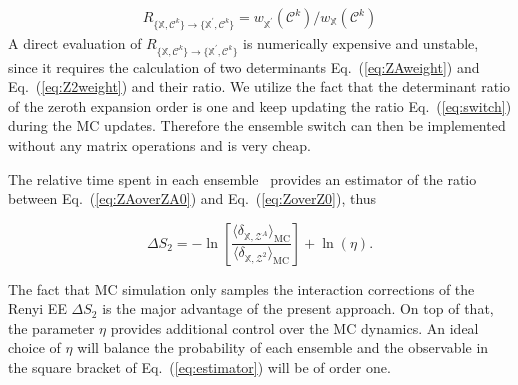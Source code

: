 \documentclass[12pt,onecolumn,english,prl,showpacs,nofootinbib]{revtex4-1}
\begin{document}
\begin{eqnarray}
R_{\{\mathbb{X}, \mathcal{C}^{k}\} \rightarrow \{\mathbb{X}^{\prime}, \mathcal{C}^{k}\} } = {w_{\mathbb{X}^{\prime}}(\mathcal{C}^{k})}/{w_{\mathbb{X}}(\mathcal{C}^{k})}
\label{eq:switch}
\end{eqnarray} 
A direct evaluation of $R_{\{\mathbb{X}, \mathcal{C}^{k}\} \rightarrow \{\mathbb{X}^{\prime}, \mathcal{C}^{k}\}}$ is numerically expensive and unstable, since it requires the calculation of two determinants Eq.~(\ref{eq:ZAweight}) and Eq.~(\ref{eq:Z2weight}) and their ratio. We utilize the fact that the determinant ratio of the zeroth expansion order is one and keep updating the ratio Eq.~(\ref{eq:switch}) during the MC updates. Therefore the ensemble switch can then be implemented without any matrix operations and is very cheap. 

The relative time spent in each ensemble~\cite{Humeniuk:2012cq}  provides an estimator of the ratio between Eq.~(\ref{eq:ZAoverZA0}) and Eq.~(\ref{eq:ZoverZ0}), thus 

\begin{equation}
\Delta S_{2} = -\ln\left [\frac{\langle \delta_{\mathbb{X},\mathcal{Z}^{A}} \rangle_\mathrm{MC}}{ \langle \delta _{\mathbb{X}, \mathcal{Z}^{2}} \rangle_\mathrm{MC}} \right ] + \ln(\eta).
\label{eq:estimator}
\end{equation}

The fact that MC simulation only samples the interaction corrections of the Renyi EE $\Delta S_{2}$ is the major advantage of the present approach. On top of that, the parameter $\eta$ provides additional control over the MC dynamics. An ideal choice of $\eta$ will balance the probability of each ensemble and the observable in the square bracket of Eq.~(\ref{eq:estimator}) will be of order one. 

\end{document}
